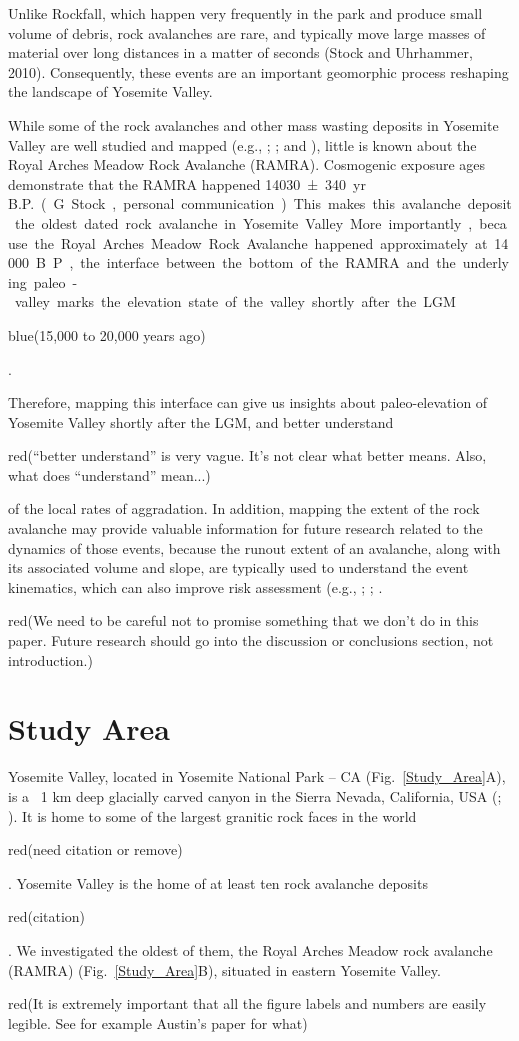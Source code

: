 \documentclass[5p]{elsarticle}
\newcommand{\COMON}{\begin{color}{blue}}
\newcommand{\COMOFF}{\end{color}}
\newcommand{\alon}{\begin{color}{red}}
\newcommand{\aloff}{\end{color}}
\begin{document}
Unlike Rockfall, which happen very frequently in the park and produce small volume of debris, rock avalanches are rare, and typically move large masses of material over long distances in a matter of seconds (Stock and Uhrhammer, 2010). Consequently, these events are an important geomorphic process reshaping the landscape of Yosemite Valley. 

While some of the rock avalanches and other mass wasting deposits in Yosemite Valley are well studied and mapped (e.g., \cite{stock2014quantitative};  \cite{stock2010catastrophic}; and \cite{wieczorek1998rockfall}), little is known about the Royal Arches Meadow Rock Avalanche (RAMRA). Cosmogenic  exposure ages demonstrate that the RAMRA happened \SI{14030 \pm 340}{yr\, B.P.} (G. Stock, personal communication). This makes this avalanche deposit the oldest dated rock avalanche in Yosemite Valley. More importantly, because the Royal Arches Meadow Rock Avalanche happened approximately at 14000 B.P., the interface between the bottom of the RAMRA and the underlying paleo-valley marks the elevation state of the valley shortly after the LGM \COMON(15,000 to 20,000 years ago)\COMOFF. 

Therefore, mapping this interface can give us insights about paleo-elevation of Yosemite Valley shortly after the LGM, and better understand \alon (``better understand'' is very vague. It's not clear what better means. Also, what does ``understand'' mean...) \aloff of the local rates of aggradation. In addition, mapping the extent of the rock avalanche may provide valuable information for future research related to the dynamics of those events, because the runout extent of an avalanche, along with its associated volume and slope, are typically used to understand the event kinematics, which can also improve risk assessment (e.g., \cite{wieczorek1998rockfall}; \cite{guzzetti2003rockfall}; \cite{stock2014quantitative}. \alon (We need to be careful not to promise something that we don't do in this paper. Future research should go into the discussion or conclusions section, not introduction.) \aloff





\section{Study Area}

Yosemite Valley, located in Yosemite National Park -- CA (Fig.~\ref{Study_Area}A), is a ~1  km deep glacially carved canyon in the Sierra Nevada, California, USA (\cite{matthes1930geologic}; \cite{huber1987geologic}). It is home to some of the largest granitic rock faces in the world \alon (need citation or remove)\aloff. Yosemite Valley is the home of at least ten rock avalanche deposits \alon(citation)\aloff. We investigated the oldest of them, the Royal Arches Meadow rock avalanche (RAMRA) (Fig.~\ref{Study_Area}B), situated in eastern Yosemite Valley. \alon(It is extremely important that all the figure labels and numbers are easily legible. See for example Austin's paper for what)\aloff
\end{document}
